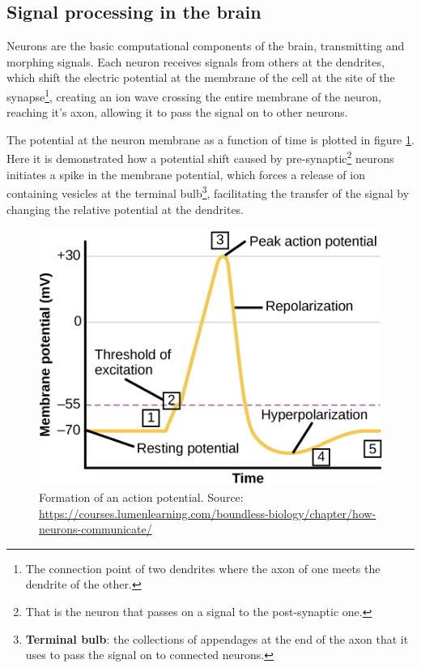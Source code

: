 \documentclass[a4paper,twocolumn]{article}
\begin{document}
\subsection{Signal processing in the brain}
Neurons are the basic computational components of the
brain, transmitting and morphing signals. Each neuron receives signals from
others at the dendrites, which shift the electric potential at the membrane of
the cell at the site of the synapse\footnote{The connection point of two
dendrites where the axon of one meets the dendrite of the other.}, creating an
ion wave crossing the entire membrane of the neuron, reaching it's axon,
allowing it to pass the signal on to other neurons.

The potential at the neuron membrane as a function of time is plotted in figure
\ref{fig:action-potential}. Here it is demonstrated how a potential shift caused
by pre-synaptic\footnote{That is the neuron that passes on a signal to the
post-synaptic one.} neurons initiates a spike in the membrane potential, which
forces a release of ion containing vesicles at the terminal
bulb\footnote{\textbf{Terminal bulb}: the collections of appendages at the end
of the axon that it uses to pass the signal on to connected neurons.},
facilitating the transfer of the signal by changing the relative potential at
the dendrites.

\begin{figure}[ht]
    \centering
    \includegraphics[width=.5\textwidth]{figures/action-potential.png}
    \caption{Formation of an action potential. Source:  \url{https://courses.lumenlearning.com/boundless-biology/chapter/how-neurons-communicate/}}
    \label{fig:action-potential}
\end{figure}
\end{document}
